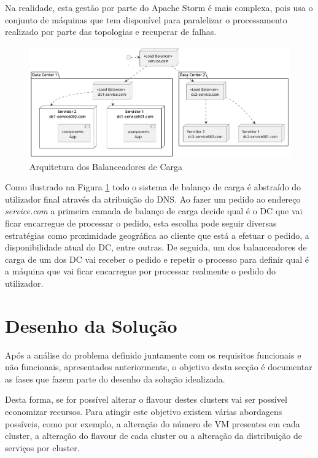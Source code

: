 Na realidade, esta gestão por parte do Apache Storm é mais complexa, pois usa o conjunto de
máquinas que tem disponível para paralelizar o processamento realizado por parte das topologias e
recuperar de falhas.

\begin{figure}[H]
  \centerline{\includegraphics[scale=0.5]{media/content/analise/lb.png}}
  \caption{Arquitetura dos Balanceadores de Carga}
  \label{lb}
\end{figure}

Como ilustrado na Figura \ref{lb} todo o sistema de balanço de carga é abstraído do utilizador
final através da atribuição do DNS. Ao fazer um pedido ao endereço \textit{service.com} a primeira
camada de balanço de carga decide qual é o \ac{DC} que vai ficar encarregue de processar o pedido,
esta escolha pode seguir diversas estratégias como proximidade geográfica ao cliente que está a 
efetuar o pedido, a disponibilidade atual do \ac{DC}, entre outras. De seguida, um dos 
balanceadores de carga de um dos \ac{DC} vai receber o pedido e repetir o processo para definir
qual é a máquina que vai ficar encarregue por processar realmente o pedido do utilizador.

\section{Desenho da Solução}

Após a análise do problema definido juntamente com os requisitos funcionais e não funcionais,
apresentados anteriormente, o objetivo desta secção é documentar as fases que fazem parte do
desenho da solução idealizada.

Desta forma, se for possível alterar o \gls{flavour} destes \glspl{cluster} vai ser possível economizar
recursos. Para atingir este objetivo existem várias abordagens possíveis, como por exemplo, a
alteração do número de \ac{VM} presentes em cada \gls{cluster}, a alteração do \gls{flavour}
de cada \gls{cluster} ou a alteração da distribuição de serviços por \gls{cluster}.

